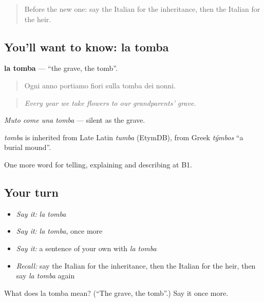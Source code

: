 \begin{quote}
Before the new one: say the Italian for the inheritance, then the Italian for the heir.
\end{quote}

\subsection*{You'll want to know: la tomba}
\textbf{la tomba} — \textquotedblleft{}the grave, the tomb\textquotedblright{}.

\begin{quote}
Ogni anno portiamo fiori sulla tomba dei nonni.
\end{quote}

\begin{quote}
\emph{Every year we take flowers to our grandparents' grave.}
\end{quote}

\emph{Muto come una tomba} — silent as the grave.

\begin{cousinweb}
\emph{tomba} is inherited from Late Latin \emph{tumba} (EtymDB), from Greek \emph{týmbos} \textquotedblleft{}a burial mound\textquotedblright{}.
\end{cousinweb}

\begin{grammarlens}[title={What you've built}]
One more word for telling, explaining and describing at B1.
\end{grammarlens}

\subsection*{Your turn}
\begin{itemize}
\raggedright
  \item \emph{Say it:} \emph{la tomba}
  \item \emph{Say it:} \emph{la tomba}, once more
  \item \emph{Say it:} a sentence of your own with \emph{la tomba}
  \item \emph{Recall:} say the Italian for the inheritance, then the Italian for the heir, then say \emph{la tomba} again
\end{itemize}

\begin{tcolorbox}[breakable,colback=teal!4,colframe=teal!35!black,title={Before you move on}]
What does la tomba mean? (\textquotedblleft{}The grave, the tomb\textquotedblright{}.) Say it once more.
\end{tcolorbox}
